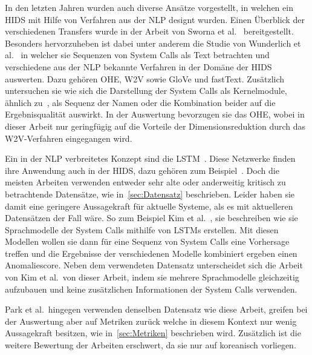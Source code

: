         In den letzten Jahren wurden auch diverse Ansätze vorgestellt, in welchen ein \ac{HIDS} mit Hilfe von Verfahren aus der \ac{NLP} designt wurden.
        Einen Überblick der verschiedenen Transfers wurde in der Arbeit von Sworna et al.~\cite{NLPHIDSSWORNA2022} bereitgestellt.
        Besonders hervorzuheben ist dabei unter anderem die Studie von Wunderlich et al.~\cite{W2VWUNDERLICH2019} in welcher sie Sequenzen von System Calls als Text betrachten und verschiedene aus der \ac{NLP} bekannte Verfahren in der Domäne der \ac{HIDS} auswerten.
        Dazu gehören \ac{OHE}, \ac{W2V} sowie GloVe und fastText. 
        Zusätzlich untersuchen sie wie sich die Darstellung der System Calls als Kernelmodule, ähnlich zu~\cite{SYSTEM_STATES}, als Sequenz der Namen oder die Kombination beider auf die Ergebnisqualität auswirkt.
        In der Auswertung bevorzugen sie das \ac{OHE}, wobei in dieser Arbeit nur geringfügig auf die Vorteile der Dimensionsreduktion durch das \ac{W2V}-Verfahren eingegangen wird.

        Ein in der \ac{NLP} verbreitetes Konzept sind die \ac{LSTM}~\cite{LSTMNLP2016,LSTMREVIEWYU2019}.
        Diese Netzwerke finden ihre Anwendung auch in der \ac{HIDS}, dazu gehören zum Beispiel~\cite{LSTMsys, LSTMPARK2021, LSTMSURATKAR2019, NIU2020, BIDIRECTIONALLSTMCHAWLA2019, VARIATIONALLSTMBOUZAR2019}.
        Doch die meisten Arbeiten verwenden entweder sehr alte oder anderweitig kritisch zu betrachtende Datensätze, wie in~\autoref{sec:Datensatz} beschrieben.
        Leider haben sie damit eine geringere Aussagekraft für aktuelle Systeme, als es mit aktuelleren Datensätzen der Fall wäre.
        So zum Beispiel Kim et al.~\cite{LSTMsys}, sie beschreiben wie sie Sprachmodelle der System Calls mithilfe von \acp{LSTM} erstellen.
        Mit diesen Modellen wollen sie dann für eine Sequenz von System Calls eine Vorhersage treffen und die Ergebnisse der verschiedenen Modelle kombiniert ergeben einen Anomaliescore.
        Neben dem verwendeten Datensatz unterscheidet sich die Arbeit von Kim et al.\ von dieser Arbeit, indem sie mehrere Sprachmodelle gleichzeitig aufzubauen und keine zusätzlichen Informationen der System Calls verwenden.

        Park et al.\ hingegen verwenden denselben Datensatz wie diese Arbeit, greifen bei der Auswertung aber auf Metriken zurück welche in diesem Kontext nur wenig Aussagekraft besitzen, wie in~\autoref{sec:Metriken} beschrieben wird.
        Zusätzlich ist die weitere Bewertung der Arbeiten erschwert, da sie nur auf koreanisch vorliegen.~\cite{PARK2021}

